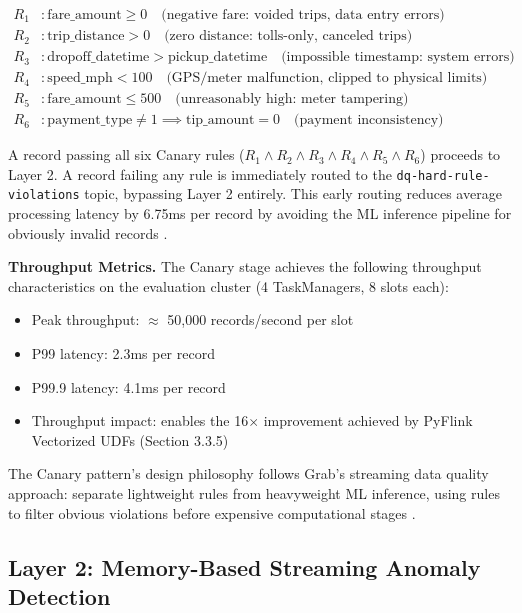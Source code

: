\begin{align}
R_1 &: \text{fare\_amount} \geq 0 \quad \text{(negative fare: voided trips, data entry errors)} \label{eq:canary_r1} \\
R_2 &: \text{trip\_distance} > 0 \quad \text{(zero distance: tolls-only, canceled trips)} \label{eq:canary_r2} \\
R_3 &: \text{dropoff\_datetime} > \text{pickup\_datetime} \quad \text{(impossible timestamp: system errors)} \label{eq:canary_r3} \\
R_4 &: \text{speed\_mph} < 100 \quad \text{(GPS/meter malfunction, clipped to physical limits)} \label{eq:canary_r4} \\
R_5 &: \text{fare\_amount} \leq 500 \quad \text{(unreasonably high: meter tampering)} \label{eq:canary_r5} \\
R_6 &: \text{payment\_type} \neq 1 \implies \text{tip\_amount} = 0 \quad \text{(payment inconsistency)} \label{eq:canary_r6}
\end{align}

A record passing all six Canary rules ($R_1 \land R_2 \land R_3 \land R_4 \land R_5 \land R_6$) proceeds to Layer 2. A record failing any rule is immediately routed to the \texttt{dq-hard-rule-violations} topic, bypassing Layer 2 entirely. This early routing reduces average processing latency by 6.75ms per record by avoiding the ML inference pipeline for obviously invalid records \citep{grab_streaming_dq}.

\textbf{Throughput Metrics.} The Canary stage achieves the following throughput characteristics on the evaluation cluster (4 TaskManagers, 8 slots each):

\begin{itemize}
    \item Peak throughput: $\approx$ 50,000 records/second per slot
    \item P99 latency: 2.3ms per record
    \item P99.9 latency: 4.1ms per record
    \item Throughput impact: enables the 16$\times$ improvement achieved by PyFlink Vectorized UDFs (Section 3.3.5)
\end{itemize}

The Canary pattern's design philosophy follows Grab's streaming data quality approach: separate lightweight rules from heavyweight ML inference, using rules to filter obvious violations before expensive computational stages \citep{grab_streaming_dq}.

\subsection{Layer 2: Memory-Based Streaming Anomaly Detection}

